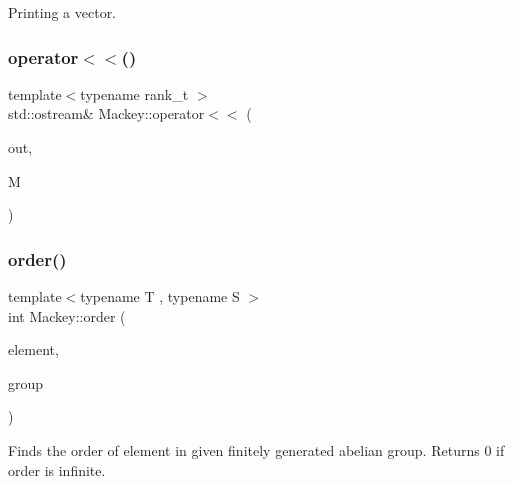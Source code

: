 Printing a vector. 

\mbox{\label{namespaceMackey_aaf9e6d978fdb55a757223964390b2fc0}} 
\subsubsection{\texorpdfstring{operator$<$$<$()}{operator<<()}\hspace{0.1cm}{\footnotesize\ttfamily [2/2]}}
{\footnotesize\ttfamily template$<$typename rank\+\_\+t $>$ \\
std\+::ostream\& Mackey\+::operator$<$$<$ (\begin{DoxyParamCaption}\item[{std\+::ostream \&}]{out,  }\item[{const \hyperlink{classMackey_1_1MackeyFunctor}{Mackey\+Functor}$<$ rank\+\_\+t $>$ \&}]{M }\end{DoxyParamCaption})}

\mbox{\label{namespaceMackey_a4abdca157edcf425b1e7ceff39d74c2f}} 
\subsubsection{\texorpdfstring{order()}{order()}}
{\footnotesize\ttfamily template$<$typename T , typename S $>$ \\
int Mackey\+::order (\begin{DoxyParamCaption}\item[{const T \&}]{element,  }\item[{const S \&}]{group }\end{DoxyParamCaption})}



Finds the order of element in given finitely generated abelian group. Returns 0 if order is infinite. 

